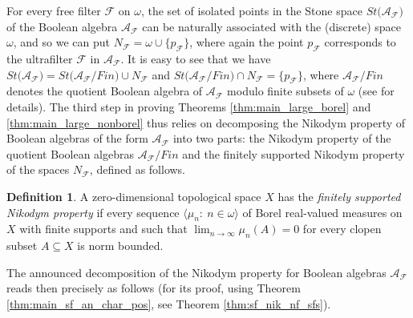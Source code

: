 \documentclass[a4paper,11pt,fleqn]{amsart}
\theoremstyle{definition}
\newtheorem{definition}[theorem]{Definition}
\theoremstyle{remark}
\numberwithin{equation}{section}
\newcommand{\N}{\mathbb{N}}
\newcommand{\aA}{\mathcal{A}}
\newcommand{\fF}{\mathcal{F}}
\newcommand{\sub}{\subseteq}
\newcommand{\seqn}[1]{\big\langle#1\colon\ n\io\big\rangle}
\newcommand{\io}{\in\omega}%
\begin{document}
For every free filter $\fF$ on $\omega$, the set of isolated points in the Stone space $St\big(\aA_\fF\big)$ of the Boolean algebra $\aA_\fF$ can be naturally associated with the (discrete) space $\omega$, and so we can put $N_\fF=\omega\cup\big\{p_\fF\big\}$, where again the point $p_\fF$ corresponds to the ultrafilter $\fF$ in $\aA_\fF$. It is easy to see that we have $St\big(\aA_\fF\big)=St\big(\aA_\fF/Fin\big)\cup N_\fF$ and $St\big(\aA_\fF/Fin\big)\cap N_\fF=\big\{p_\fF\big\}$, where $\aA_\fF/Fin$ denotes the quotient Boolean algebra of $\aA_\fF$ modulo finite subsets of $\omega$ (see \cite[Section 3]{MS24} for details). The third step in proving Theorems \ref{thm:main_large_borel} and \ref{thm:main_large_nonborel} thus relies on decomposing the Nikodym property of Boolean algebras of the form $\aA_\fF$ into two parts: the Nikodym property of the quotient Boolean algebras $\aA_\fF/Fin$ and the finitely supported Nikodym property of the spaces $N_\fF$, defined as follows.%

\begin{definition}\label{def:fsNp}
A zero-dimensional topological space $X$ has the \textit{finitely supported Nikodym property} if every sequence $\seqn{\mu_n}$ of Borel real-valued measures on $X$ with finite supports and such that $\lim_{n\to\infty}\mu_n(A)=0$ for every clopen subset $A\sub X$ is norm bounded.
\end{definition}
%
%

The announced decomposition of the Nikodym property for Boolean algebras $\aA_\fF$ reads then precisely as follows (for its proof, using Theorem \ref{thm:main_sf_an_char_pos}, see Theorem \ref{thm:sf_nik_nf_sfs}).
\end{document}
